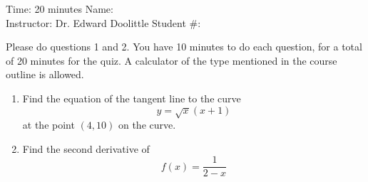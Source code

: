 \documentclass[12pt]{article}
\begin{document}
\thispagestyle{plain}

\begin{flushleft}
Time:  20 minutes                \hfill       Name: \underline{\hspace{2in}} \\
Instructor: Dr. Edward Doolittle \hfill Student \#: \underline{\hspace{2in}}
\end{flushleft}

\noindent
Please do questions 1 and 2.  You have 10 minutes
to do each question, for a total of 20
minutes for the quiz.  
A calculator of the type mentioned in the course outline is allowed.

\begin{enumerate}
\item Find
  the equation of the tangent line to the curve
  \begin{equation*}
    y = \sqrt{x}(x+1)
  \end{equation*}
  at the point $(4,10)$ on the curve.
\newpage
\item Find 
  the second derivative of
  \begin{equation*}
    f(x) = \frac{1}{2-x}
  \end{equation*}
\end{enumerate}
\end{document}
